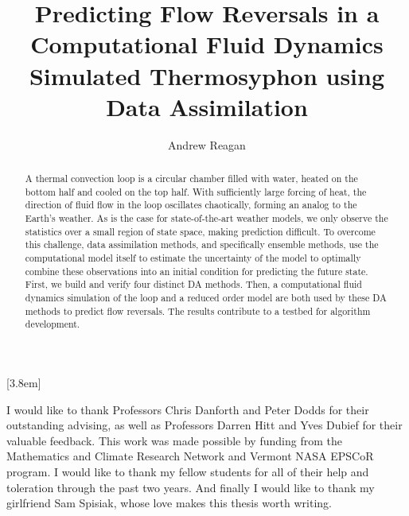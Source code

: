 \documentclass[12pt]{report}
\title{Predicting Flow Reversals in a Computational Fluid Dynamics Simulated Thermosyphon using Data Assimilation}
\author{Andrew Reagan}
\begin{document}
              [3.8em]
              {}
              {\contentslabel{2.3em}}
              {\hspace*{-2.3em}}
              {\contentspage}

\maketitle
\makeacceptance

\begin{abstract}
A thermal convection loop is a circular chamber filled with water, heated on the bottom half and cooled on the top half.
With sufficiently large forcing of heat, the direction of fluid flow in the loop oscillates chaotically, forming an analog to the Earth's weather.
As is the case for state-of-the-art weather models, we only observe the statistics over a small region of state space, making prediction difficult.
To overcome this challenge, data assimilation methods, and specifically ensemble methods, use the computational model itself to estimate the uncertainty of the model to optimally combine these observations into an initial condition for predicting the future state.
First, we build and verify four distinct DA methods.
Then, a computational fluid dynamics simulation of the loop and a reduced order model are both used by these DA methods to predict flow reversals.
The results contribute to a testbed for algorithm development.

\end{abstract}


\begin{acknowledgements}
I would like to thank Professors Chris Danforth and Peter Dodds for their outstanding advising, as well as Professors Darren Hitt and Yves Dubief for their valuable feedback.
This work was made possible by funding from the Mathematics and Climate Research Network and Vermont NASA EPSCoR program.
I would like to thank my fellow students for all of their help and toleration through the past two years.
And finally I would like to thank my girlfriend Sam Spisiak, whose love makes this thesis worth writing.
\end{acknowledgements}
\end{document}
